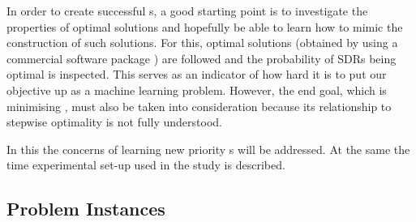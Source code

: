 \documentclass[twocolumn]{svjour3}
\begin{document}
In order to create successful \dr s, a good starting point is to 
investigate the properties of optimal solutions and hopefully be able to learn 
how to mimic the construction of such solutions. For this, optimal 
solutions (obtained by using a commercial software package \cite{gurobi}) are 
followed and the probability of SDRs being optimal is inspected. 
This serves as an indicator of how hard it is to put our objective up as a 
machine learning problem. 
However, the end goal, which is minimising \namerho, must also be taken into 
consideration because its relationship to stepwise optimality is not fully 
understood.

In this  the concerns of learning new priority \dr s 
will be addressed. At the same the time experimental set-up used in the study 
is described. 

\subsection{Problem Instances}\label{sec:data:sim}
\end{document}
